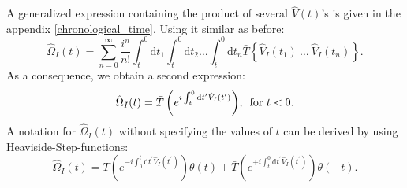 \documentclass[
12pt, %
english, %
singlespacing, %
headsepline, %
]{MastersDoctoralThesis} %
\begin{document}
A generalized expression containing the product of several $ \hat{V}(t) $'s is given in the appendix \ref{chronological_time}.
Using it similar as before:
\begin{equation}
\hat{\Omega}_{I}(t) =
\sum\limits_{n=0}^{\infty} 
\frac{i^{n}}{n!}
\int^{0}_{t}\mathrm{d}t_1\int^{0}_{t}\! \! \mathrm{d}t_2
 \ldots
 \int^{0}_{t}\! \! \mathrm{d}t_n
 \bar{T}\left\lbrace \hat{V}_{I}(t_1)\ \ldots \ \hat{V}_{I}(t_n)\right\rbrace .
\end{equation}
As a consequence, we obtain a second expression:\begin{equation}\label{eq:Omega_I_Chron1_0<}
\hat{\Omega}_{I}(t)
= \bar{T}\left( e^{i\int^{0}_{t}\mathrm{d}t^{\prime} \hat{V}_{I}(t^{\prime})} \right)
	\! ,\text{\enskip for  }  t<0 
	.
\end{equation}
A notation for $ \hat{\Omega}_{I}(t) $ without specifying the values of $ t $ can be derived by using Heaviside-Step-functions:
\begin{equation}\label{Omega_i_complete}
\hat{\Omega}_{I}(t)
=T\left( e^{-i\int_{0}^{t}\mathrm{d}t^{\prime} \hat{V}_{I}(t^{\prime})} \right)
\theta(t)
+
 \bar{T}\left( e^{+i\int_{t}^{0}\mathrm{d}t^{\prime} \hat{V}_{I}(t^{\prime})} \right)
 \theta(-t)
 .
\end{equation}
\end{document}
